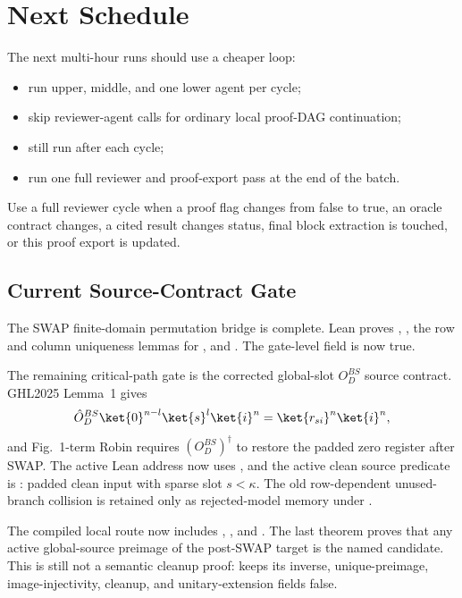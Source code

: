 \section{Next Schedule}

The next multi-hour runs should use a cheaper loop:

\begin{itemize}
\item run upper, middle, and one lower agent per cycle;
\item skip reviewer-agent calls for ordinary local proof-DAG continuation;
\item still run  after each cycle;
\item run one full reviewer and proof-export pass at the end of the batch.
\end{itemize}

Use a full reviewer cycle when a proof flag changes from false to true, an
oracle contract changes, a cited result changes status, final block extraction
is touched, or this proof export is updated.

\subsection{Current Source-Contract Gate}

The SWAP finite-domain permutation bridge is complete.  Lean proves
, , the row and
column uniqueness lemmas for , and
.  The gate-level field
 is now true.

The remaining critical-path gate is the corrected global-slot \(O_D^{BS}\)
source contract.  GHL2025 Lemma~1 gives
\[
  \hat O_D^{BS}\ket{0}^{n-l}\ket{s}^{l}\ket{i}^{n}
  =
  \ket{r_{si}}^{n}\ket{i}^{n},
\]
and Fig.~1-term Robin requires \((O_D^{BS})^\dagger\) to restore the padded
zero register after SWAP.  The active Lean address now uses
, and the active clean source predicate
is : padded clean input with
sparse slot \(s<\kappa\).  The old row-dependent unused-branch collision is
retained only as rejected-model memory under
.

The compiled local route now includes
,
, and
.
The last theorem proves that any active global-source preimage of the
post-SWAP target is the named candidate.  This is still not a semantic cleanup
proof:  keeps its
inverse, unique-preimage, image-injectivity, cleanup, and unitary-extension
fields false.

